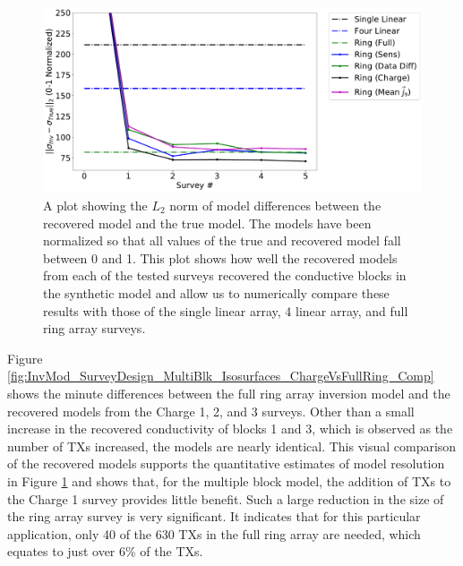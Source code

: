 \documentclass[preprint,authoryear,12pt]{elsarticle}
\begin{document}
\begin{figure} [htp]
   \begin{center}
      \includegraphics[trim=0cm 0cm 0cm 0cm, clip=true,width=0.9\linewidth]{./figures/Fig21.pdf}
   \end{center}
   \vspace{-0.5cm}
\caption{A plot showing the $L_2$ norm of model differences between the recovered model and the true model. The models have been normalized so that all values of the true and recovered model fall between 0 and 1. This plot shows how well the recovered models from each of the tested surveys recovered the conductive blocks in the synthetic model and allow us to numerically compare these results with those of the single linear array, 4 linear array, and full ring array surveys.}
\label{fig:SurveyDesignComp_StraightTunnel_MultiBlk}
\end{figure}


Figure \ref{fig:InvMod_SurveyDesign_MultiBlk_Isosurfaces_ChargeVsFullRing_Comp} shows the minute differences between the full ring array inversion model and the recovered models from the Charge 1, 2, and 3 surveys. Other than a small increase in the recovered conductivity of blocks 1 and 3, which is observed as the number of TXs increased, the models are nearly identical. This visual comparison of the recovered models supports the quantitative estimates of model resolution in Figure \ref{fig:SurveyDesignComp_StraightTunnel_MultiBlk} and shows that, for the multiple block model, the addition of TXs to the Charge 1 survey provides little benefit. Such a large reduction in the size of the ring array survey is very significant. It indicates that for this particular application, only 40 of the 630 TXs in the full ring array are needed, which equates to just over 6\% of the TXs.
\end{document}
